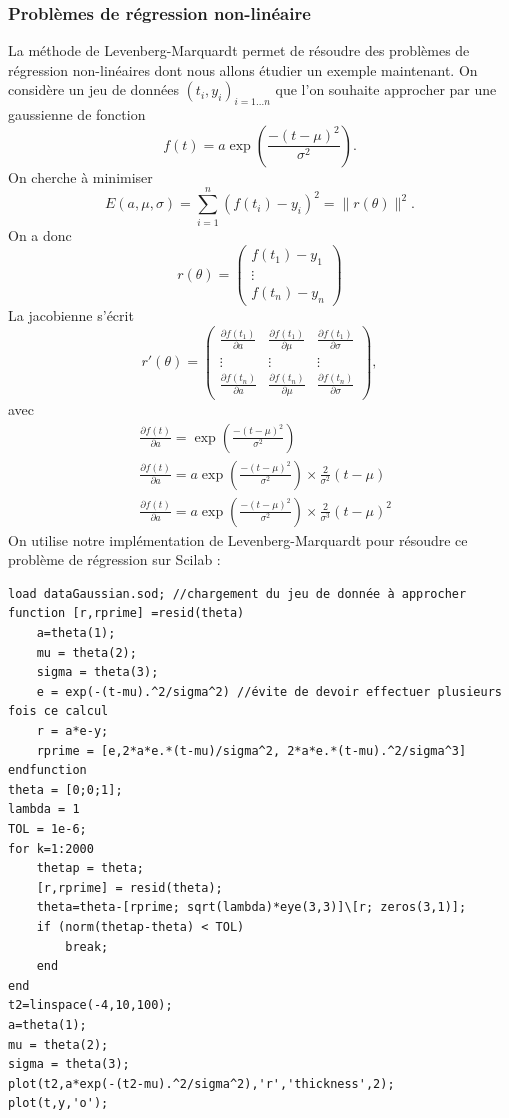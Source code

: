       \subsubsection{Problèmes de régression non-linéaire}
      La méthode de Levenberg-Marquardt permet de résoudre des problèmes de régression non-linéaires dont nous allons étudier un exemple maintenant. On considère un jeu de données $(t_i,y_i)_{i=1...n}$ que l'on souhaite approcher par une gaussienne de fonction 
      $$
      f(t) = a \exp(\frac{-(t-\mu)^2}{\sigma^2}).
      $$
      On cherche à minimiser 
      $$
      E(a,\mu,\sigma) = \sum^n_{i=1}(f(t_i)-y_i)^2 = \lVert r(\theta)\lVert^2.
      $$
      On a donc 
      $$
      r(\theta) = \begin{pmatrix}
          f(t_1)-y_1\\\vdots\\f(t_n)-y_n
      \end{pmatrix}
      $$
      La jacobienne s'écrit 
      $$
      r'(\theta) = \begin{pmatrix}
          \frac{\partial f(t_1)}{\partial a}&\frac{\partial f(t_1)}{\partial \mu}&\frac{\partial f(t_1)}{\partial \sigma}\\
          \vdots&\vdots&\vdots\\
          \frac{\partial f(t_n)}{\partial a}&\frac{\partial f(t_n)}{\partial \mu}&\frac{\partial f(t_n)}{\partial \sigma}
      \end{pmatrix},
      $$
      avec 
      \begin{align*}
          &\frac{\partial f(t)}{\partial a} = \exp(\frac{-(t-\mu)^2}{\sigma^2})\\
          &\frac{\partial f(t)}{\partial a} = a\exp(\frac{-(t-\mu)^2}{\sigma^2})\times \frac{2}{\sigma^2}(t-\mu)\\
          &\frac{\partial f(t)}{\partial a} = a\exp(\frac{-(t-\mu)^2}{\sigma^2})\times \frac{2}{\sigma^3}(t-\mu)^2
      \end{align*}
      On utilise notre implémentation de Levenberg-Marquardt pour résoudre ce problème de régression sur Scilab :
       \begin{center}
          \begin{verbatim}
load dataGaussian.sod; //chargement du jeu de donnée à approcher
function [r,rprime] =resid(theta)
    a=theta(1);
    mu = theta(2);
    sigma = theta(3);
    e = exp(-(t-mu).^2/sigma^2) //évite de devoir effectuer plusieurs fois ce calcul
    r = a*e-y;
    rprime = [e,2*a*e.*(t-mu)/sigma^2, 2*a*e.*(t-mu).^2/sigma^3]
endfunction
theta = [0;0;1];
lambda = 1
TOL = 1e-6;
for k=1:2000
    thetap = theta;
    [r,rprime] = resid(theta);
    theta=theta-[rprime; sqrt(lambda)*eye(3,3)]\[r; zeros(3,1)];
    if (norm(thetap-theta) < TOL)
        break;
    end
end
t2=linspace(-4,10,100);
a=theta(1);
mu = theta(2);
sigma = theta(3);
plot(t2,a*exp(-(t2-mu).^2/sigma^2),'r','thickness',2);
plot(t,y,'o');
          \end{verbatim}
                \label{lst:code_14}
         \end{center}
